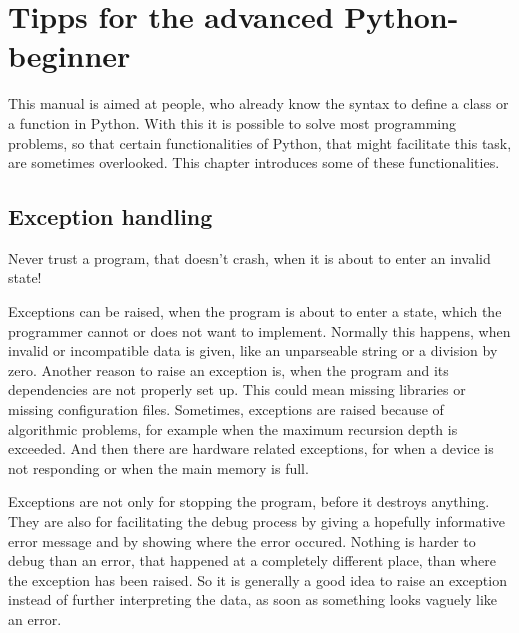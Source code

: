 
\chapter{Tipps for the advanced Python-beginner}
	This manual is aimed at people, who already know the syntax to define a class or a function in Python.
	With this it is possible to solve most programming problems, so that certain functionalities of Python, that might facilitate this task, are sometimes overlooked.
	This chapter introduces some of these functionalities.

	\section{Exception handling}
		Never trust a program, that doesn't crash, when it is about to enter an invalid state!

		Exceptions can be raised, when the program is about to enter a state, which the programmer cannot or does not want to implement.
		Normally this happens, when invalid or incompatible data is given, like an unparseable string or a division by zero.
		Another reason to raise an exception is, when the program and its dependencies are not properly set up.
		This could mean missing libraries or missing configuration files.
		Sometimes, exceptions are raised because of algorithmic problems, for example when the maximum recursion depth is exceeded.
		And then there are hardware related exceptions, for when a device is not responding or when the main memory is full.

		Exceptions are not only for stopping the program, before it destroys anything.
		They are also for facilitating the debug process by giving a hopefully informative error message and by showing where the error occured.
		Nothing is harder to debug than an error, that happened at a completely different place, than where the exception has been raised.
		So it is generally a good idea to raise an exception instead of further interpreting the data, as soon as something looks vaguely like an error.

